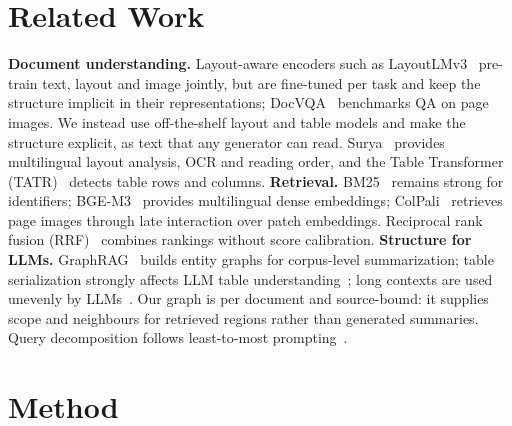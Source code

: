 \documentclass[conference]{IEEEtran}
\begin{document}
\section{Related Work}
\textbf{Document understanding.} Layout-aware encoders such as LayoutLMv3~\cite{huang2022layoutlmv3} pre-train text, layout and image jointly, but are fine-tuned per task and keep the structure implicit in their representations; DocVQA~\cite{mathew2021docvqa} benchmarks QA on page images. We instead use off-the-shelf layout and table models and make the structure explicit, as text that any generator can read. Surya~\cite{paruchuri2024surya} provides multilingual layout analysis, OCR and reading order, and the Table Transformer (TATR)~\cite{smock2022pubtables} detects table rows and columns. \textbf{Retrieval.} BM25~\cite{robertson2009bm25} remains strong for identifiers; BGE-M3~\cite{chen2024bgem3} provides multilingual dense embeddings; ColPali~\cite{faysse2025colpali} retrieves page images through late interaction over patch embeddings. Reciprocal rank fusion (RRF)~\cite{cormack2009rrf} combines rankings without score calibration. \textbf{Structure for LLMs.} GraphRAG~\cite{edge2024graphrag} builds entity graphs for corpus-level summarization; table serialization strongly affects LLM table understanding~\cite{sui2024table}; long contexts are used unevenly by LLMs~\cite{liu2024lost}. Our graph is per document and source-bound: it supplies scope and neighbours for retrieved regions rather than generated summaries. Query decomposition follows least-to-most prompting~\cite{zhou2023leasttomost}.

\section{Method}
\end{document}
